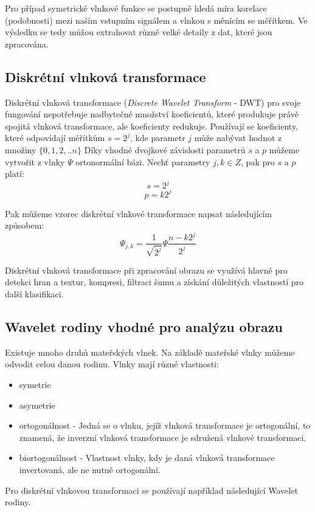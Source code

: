 Pro případ symetrické vlnkové funkce se postupně hledá míra korelace (podobnosti) mezi naším vstupním signálem a vlnkou s měnícím se měřítkem. Ve výsledku se tedy můžou extrahovat různě velké detaily z dat, které jsou zpracována. \cite{WaveletElektrorevue}

\subsection{Diskrétní vlnková transformace}
Diskrétní vlnková transformace (\textit{Discrete Wavelet Transform} - DWT) pro svoje fungování nepotřebuje nadbytečné množství koeficientů, které produkuje právě spojitá vlnková transformace, ale koeficienty redukuje. Používají se koeficienty, které odpovídají měřítkům $s = 2^j$, kde parametr $j$ může nabývat hodnot z množiny $\{0,1,2,..n\}$ Díky vhodné dvojkové závislosti parametrů $s$ a $p$ můžeme vytvořit z vlnky $\Psi$ ortonormální bázi. Nechť parametry $j, k \in Z$, pak pro $s$ a $p$ platí:
$$s = 2^j$$
$$p = k2^j$$

\noindent
Pak můžeme vzorec diskrétní vlnkové transformace napsat následujícím způsobem:
$$\Psi_{j,k} = \frac{1}{\sqrt{2^j}}\Psi\frac{n-k2^j}{2^j}$$

Diskrétní vlnková transformace při zpracování obrazu se využívá hlavně pro detekci hran a textur, kompresi, filtraci šumu a získání důležitých vlastností pro další klasifikaci. \cite{WaveletElektrorevue}

\subsection{Wavelet rodiny vhodné pro analýzu obrazu}
Existuje mnoho druhů mateřských vlnek. Na základě mateřské vlnky můžeme odvodit celou danou rodinu. Vlnky mají různé vlastnosti: \cite{PyWaveletsBrowser}
\begin{itemize}
    \item symetrie
    \item asymetrie
    \item ortogonálnost - Jedná se o vlnku, jejíž vlnková transformace je ortogonální, to znamená, že inverzní vlnková transformace je sdružená vlnkové transformaci. \cite{WaveletBasics} 
    \item biortogonálnost - Vlastnost vlnky, kdy je daná vlnková transformace invertovaná, ale ne nutně ortogonální. 
\end{itemize}

Pro diskrétní vlnkovou transformaci se používají například následující Wavelet rodiny.

